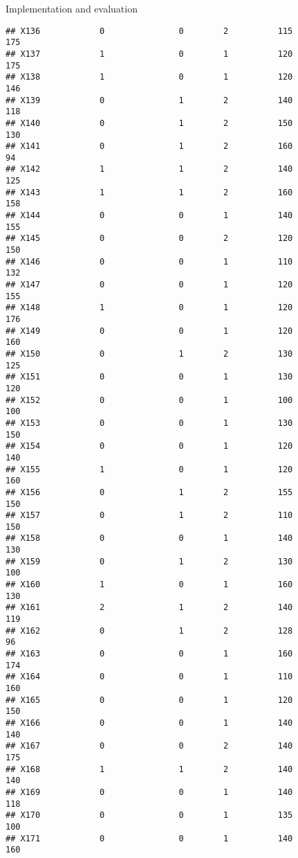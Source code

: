 \documentclass[
  ignorenonframetext,
]{beamer}
\begin{document}
\begin{frame}[fragile]{Implementation and evaluation}
\begin{verbatim}
## X136            0               0        2          115            175
## X137            1               0        1          120            175
## X138            1               0        1          120            146
## X139            0               1        2          140            118
## X140            0               1        2          150            130
## X141            0               1        2          160             94
## X142            1               1        2          140            125
## X143            1               1        2          160            158
## X144            0               0        1          140            155
## X145            0               0        2          120            150
## X146            0               0        1          110            132
## X147            0               0        1          120            155
## X148            1               0        1          120            176
## X149            0               0        1          120            160
## X150            0               1        2          130            125
## X151            0               0        1          130            120
## X152            0               0        1          100            100
## X153            0               0        1          130            150
## X154            0               0        1          120            140
## X155            1               0        1          120            160
## X156            0               1        2          155            150
## X157            0               1        2          110            150
## X158            0               0        1          140            130
## X159            0               1        2          130            100
## X160            1               0        1          160            130
## X161            2               1        2          140            119
## X162            0               1        2          128             96
## X163            0               0        1          160            174
## X164            0               0        1          110            160
## X165            0               0        1          120            150
## X166            0               0        1          140            140
## X167            0               0        2          140            175
## X168            1               1        2          140            140
## X169            0               0        1          140            118
## X170            0               0        1          135            100
## X171            0               0        1          140            160

\end{verbatim}
\end{frame}
\end{document}
